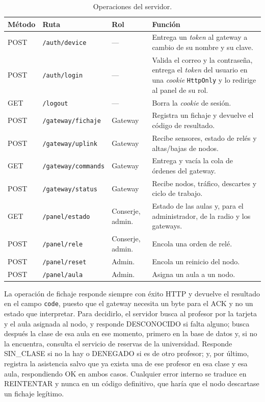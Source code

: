 \begin{table}[H]
\centering
\small
\caption{\label{tab:endpoints} Operaciones del servidor.}
\begin{tabular}{|l|l|l|p{6.2cm}|}
\hline
\textbf{Método} & \textbf{Ruta} & \textbf{Rol} & \textbf{Función} \\
\hline
POST & \texttt{/auth/device} & --- & Entrega un \textit{token} al gateway a cambio de su nombre y su clave. \\
\hline
POST & \texttt{/auth/login} & --- & Valida el correo y la contraseña, entrega el \textit{token} del usuario en una \textit{cookie} \texttt{HttpOnly} y lo redirige al panel de su rol. \\
\hline
GET & \texttt{/logout} & --- & Borra la \textit{cookie} de sesión. \\
\hline
POST & \texttt{/gateway/fichaje} & Gateway & Registra un fichaje y devuelve el código de resultado. \\
\hline
POST & \texttt{/gateway/uplink} & Gateway & Recibe sensores, estado de relés y altas/bajas de nodos. \\
\hline
GET & \texttt{/gateway/commands} & Gateway & Entrega y vacía la cola de órdenes del gateway. \\
\hline
POST & \texttt{/gateway/status} & Gateway & Recibe nodos, tráfico, descartes y ciclo de trabajo. \\
\hline
GET & \texttt{/panel/estado} & Conserje, admin. & Estado de las aulas y, para el administrador, de la radio y los gateways. \\
\hline
POST & \texttt{/panel/rele} & Conserje, admin. & Encola una orden de relé. \\
\hline
POST & \texttt{/panel/reset} & Admin. & Encola un reinicio del nodo. \\
\hline
POST & \texttt{/panel/aula} & Admin. & Asigna un aula a un nodo. \\
\hline
\end{tabular}
\end{table}

La operación de fichaje responde siempre con éxito HTTP y devuelve el resultado en el campo \texttt{code}, puesto que el gateway necesita un byte para el ACK y no un estado que interpretar. Para decidirlo, el servidor busca al profesor por la tarjeta y el aula asignada al nodo, y responde DESCONOCIDO si falta alguno; busca después la clase de esa aula en ese momento, primero en la base de datos y, si no la encuentra, consulta el servicio de reservas de la universidad. Responde SIN\_CLASE si no la hay o DENEGADO si es de otro profesor; y, por último, registra la asistencia salvo que ya exista una de ese profesor en esa clase y esa aula, respondiendo OK en ambos casos. Cualquier error interno se traduce en REINTENTAR y nunca en un código definitivo, que haría que el nodo descartase un fichaje legítimo.

